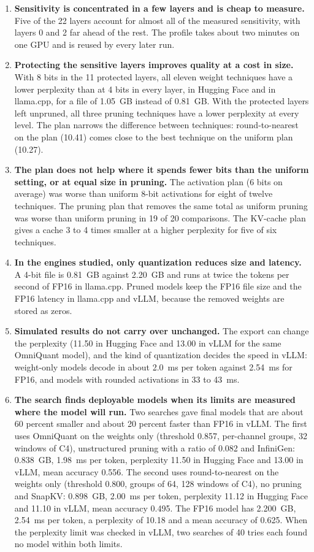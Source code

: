 \begin{enumerate}
  \item \textbf{Sensitivity is concentrated in a few layers and is cheap to measure.} Five of the 22 layers account for almost all of the measured sensitivity, with layers 0 and 2 far ahead of the rest. The profile takes about two minutes on one GPU and is reused by every later run.
  \item \textbf{Protecting the sensitive layers improves quality at a cost in size.} With 8 bits in the 11 protected layers, all eleven weight techniques have a lower perplexity than at 4 bits in every layer, in Hugging Face and in llama.cpp, for a file of 1.05~GB instead of 0.81~GB. With the protected layers left unpruned, all three pruning techniques have a lower perplexity at every level. The plan narrows the difference between techniques: round-to-nearest on the plan (10.41) comes close to the best technique on the uniform plan (10.27).
  \item \textbf{The plan does not help where it spends fewer bits than the uniform setting, or at equal size in pruning.} The activation plan (6 bits on average) was worse than uniform 8-bit activations for eight of twelve techniques. The pruning plan that removes the same total as uniform pruning was worse than uniform pruning in 19 of 20 comparisons. The KV-cache plan gives a cache 3 to 4 times smaller at a higher perplexity for five of six techniques.
  \item \textbf{In the engines studied, only quantization reduces size and latency.} A 4-bit file is 0.81~GB against 2.20~GB and runs at twice the tokens per second of FP16 in llama.cpp. Pruned models keep the FP16 file size and the FP16 latency in llama.cpp and vLLM, because the removed weights are stored as zeros.
  \item \textbf{Simulated results do not carry over unchanged.} The export can change the perplexity (11.50 in Hugging Face and 13.00 in vLLM for the same OmniQuant model), and the kind of quantization decides the speed in vLLM: weight-only models decode in about 2.0~ms per token against 2.54~ms for FP16, and models with rounded activations in 33 to 43~ms.
  \item \textbf{The search finds deployable models when its limits are measured where the model will run.} Two searches gave final models that are about 60 percent smaller and about 20 percent faster than FP16 in vLLM. The first uses OmniQuant on the weights only (threshold 0.857, per-channel groups, 32 windows of C4), unstructured pruning with a ratio of 0.082 and InfiniGen: 0.838~GB, 1.98~ms per token, perplexity 11.50 in Hugging Face and 13.00 in vLLM, mean accuracy 0.556. The second uses round-to-nearest on the weights only (threshold 0.800, groups of 64, 128 windows of C4), no pruning and SnapKV: 0.898~GB, 2.00~ms per token, perplexity 11.12 in Hugging Face and 11.10 in vLLM, mean accuracy 0.495. The FP16 model has 2.200~GB, 2.54~ms per token, a perplexity of 10.18 and a mean accuracy of 0.625. When the perplexity limit was checked in vLLM, two searches of 40 tries each found no model within both limits.

\end{enumerate}
